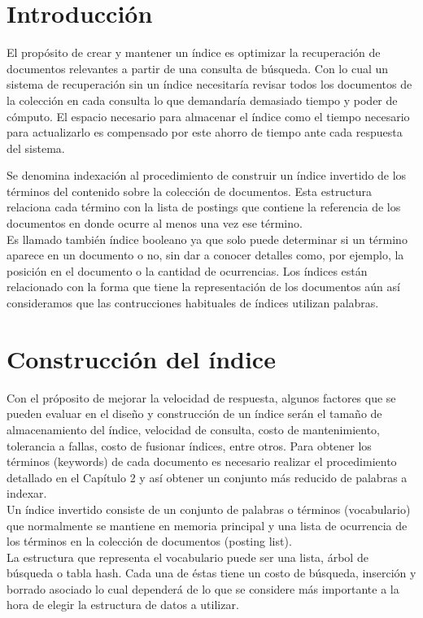 
\section{Introducción}

El propósito de crear y mantener un índice es optimizar la recuperación de documentos relevantes a partir de una consulta de búsqueda. Con lo cual un sistema de recuperación sin un índice necesitaría revisar todos los documentos de la colección en cada consulta lo que demandaría demasiado tiempo y poder de cómputo. El espacio necesario para almacenar el índice como el tiempo necesario para actualizarlo es compensado por este ahorro de tiempo ante cada respuesta del sistema. \par

Se denomina indexación al procedimiento de construir un índice invertido de los términos del contenido sobre la colección de documentos. Esta estructura relaciona cada término con la lista de postings que contiene la referencia de los documentos en donde ocurre al menos una vez ese término. \\
Es llamado también índice booleano ya que solo puede determinar si un término aparece en un documento o no, sin dar a conocer detalles como, por ejemplo, la posición en el documento o la cantidad de ocurrencias. Los índices están relacionado con la forma que tiene la representación de los documentos aún así consideramos que las contrucciones habituales de índices utilizan palabras.\par


\section{Construcción del índice}

Con el próposito de mejorar la velocidad de respuesta, algunos factores que se pueden evaluar en el diseño y construcción de un índice serán el tamaño de almacenamiento del índice, velocidad de consulta, costo de mantenimiento, tolerancia a fallas, costo de fusionar índices, entre otros.
Para obtener los términos (keywords) de cada documento es necesario realizar el procedimiento detallado en el Capítulo 2 y así obtener un conjunto más reducido de palabras a indexar. \\
Un índice invertido consiste de un conjunto de palabras o términos (vocabulario) que normalmente se mantiene en memoria principal y una lista de ocurrencia de los términos en la colección de documentos (posting list).\\
La estructura que representa el vocabulario puede ser una lista, árbol de búsqueda o tabla hash. Cada una de éstas tiene un costo de búsqueda, inserción y borrado asociado lo cual dependerá de lo que se considere más importante a la hora de elegir la estructura de datos a utilizar.\\

